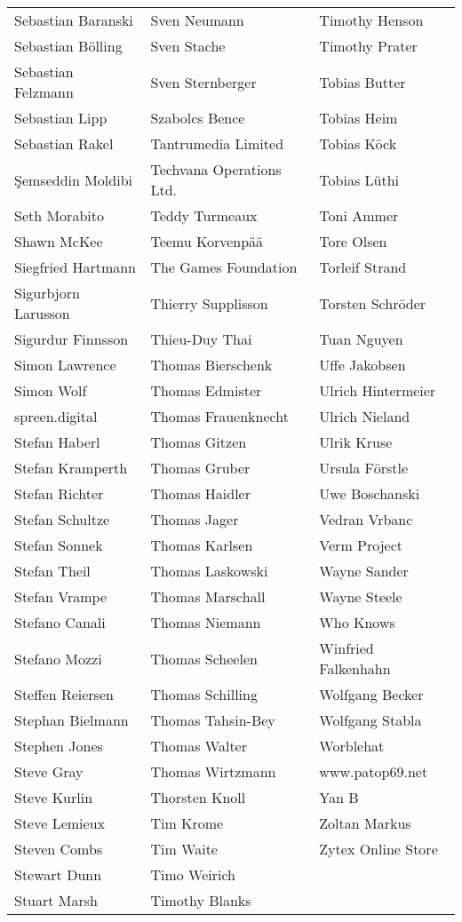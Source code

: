 \newpage
\setlength{\tabcolsep}{1mm}
\begin{tabular}{p{4.5cm}p{4.5cm}p{4.5cm}}
Sebastian Baranski & Sven Neumann & Timothy Henson \\
Sebastian Bölling & Sven Stache & Timothy Prater \\
Sebastian Felzmann & Sven Sternberger & Tobias Butter \\
Sebastian Lipp & Szabolcs Bence & Tobias Heim \\
Sebastian Rakel & Tantrumedia Limited & Tobias Köck \\
Şemseddin Moldibi & Techvana Operations Ltd. & Tobias Lüthi \\
Seth Morabito & Teddy Turmeaux & Toni Ammer \\
Shawn McKee & Teemu Korvenpää & Tore Olsen \\
Siegfried Hartmann & The Games Foundation & Torleif Strand \\
Sigurbjorn Larusson & Thierry Supplisson & Torsten Schröder \\
Sigurdur Finnsson & Thieu-Duy Thai & Tuan Nguyen \\
Simon Lawrence & Thomas Bierschenk & Uffe Jakobsen \\
Simon Wolf & Thomas Edmister & Ulrich Hintermeier \\
spreen.digital & Thomas Frauenknecht & Ulrich Nieland \\
Stefan Haberl & Thomas Gitzen & Ulrik Kruse \\
Stefan Kramperth & Thomas Gruber & Ursula Förstle \\
Stefan Richter & Thomas Haidler & Uwe Boschanski \\
Stefan Schultze & Thomas Jager & Vedran Vrbanc \\
Stefan Sonnek & Thomas Karlsen & Verm Project \\
Stefan Theil & Thomas Laskowski & Wayne Sander \\
Stefan Vrampe & Thomas Marschall & Wayne Steele \\
Stefano Canali & Thomas Niemann & Who Knows \\
Stefano Mozzi & Thomas Scheelen & Winfried Falkenhahn \\
Steffen Reiersen & Thomas Schilling & Wolfgang Becker \\
Stephan Bielmann & Thomas Tahsin-Bey & Wolfgang Stabla \\
Stephen Jones & Thomas Walter & Worblehat \\
Steve Gray & Thomas Wirtzmann & www.patop69.net \\
Steve Kurlin & Thorsten Knoll & Yan B \\
Steve Lemieux & Tim Krome & Zoltan Markus \\
Steven Combs & Tim Waite & Zytex Online Store \\
Stewart Dunn & Timo Weirich &         \\
Stuart Marsh & Timothy Blanks &         \\
\end{tabular}
